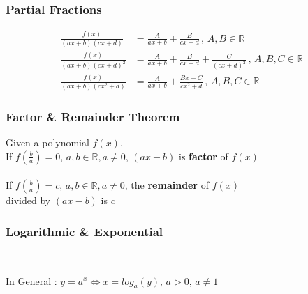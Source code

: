 \documentclass[../main.tex]{subfiles}
\begin{document}
\newpage

\subsubsection{Partial Fractions}
\begin{align*}
    \displaystyle \frac{f(x)}{(ax+b)(cx+d)} &= \frac{A}{ax+b} + \frac{B}{cx+d} \, , \, A,B \in \mathbb{R} \\
    \displaystyle \frac{f(x)}{(ax+b)(cx+d)^{2}} &= \frac{A}{ax+b} + \frac{B}{cx+d} + \frac{C}{(cx+d)^{2}} \, , \, A,B,C \in \mathbb{R} \\
    \displaystyle \frac{f(x)}{(ax+b)(cx^2+d)} &= \frac{A}{ax+b} + \frac{Bx+C}{cx^{2}+d} \, , \, A,B,C \in \mathbb{R}
\end{align*}

\subsubsection{Factor \& Remainder Theorem}
Given a polynomial \(f(x)\), \\
If \(\displaystyle f\left(\frac{b}{a}\right)=0, \, a,b \in \mathbb{R}, a\neq 0\), \((ax-b)\) is \textbf{factor} of \(f(x)\) \\\\
If \(\displaystyle f\left(\frac{b}{a}\right)=c, \, a,b \in \mathbb{R}, a\neq 0\), the \textbf{remainder} of \(f(x)\) \\
divided by \((ax-b)\) is \(c\)


\subsubsection{Logarithmic \& Exponential}
 \\

\begin{center}
    In General : \(y=a^{x} \iff x=log_{a}(y), \, a>0, \, a \neq 1\)
\end{center}
\end{document}
